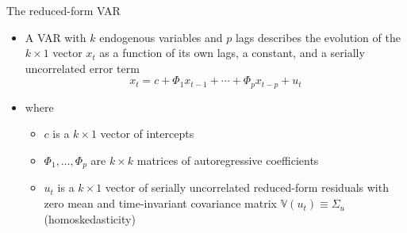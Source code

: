 \documentclass[10pt,handout]{beamer}
\begin{document}
\begin{frame}
{The reduced-form VAR}
\begin{itemize}
\item A VAR with $k$ endogenous variables and $p$ lags describes the evolution of the $k\times 1$ vector $x_t$ as a function of its own lags, a constant, and a serially uncorrelated error term
\begin{equation*}
x_{t}= c + \Phi_1 x_{t-1} + \cdots + \Phi_p x_{t-p} + u_{t}
\end{equation*}
\vspace{-.4cm}
\item where \smallskip
\begin{itemize}
\item $c$ is a $k\times 1$ vector of intercepts \smallskip
\item $\Phi_1,\ldots,\Phi_p$ are $k\times k$ matrices of autoregressive coefficients \smallskip
\item $u_t$ is a $k\times 1$ vector of serially uncorrelated reduced-form residuals with zero mean and time-invariant covariance matrix $\mathbb{V}(u_t)\equiv\Sigma_u$ (homoskedasticity) \medskip
\end{itemize}
\end{itemize}
\end{frame}
\shownotesblock{}
\end{document}
